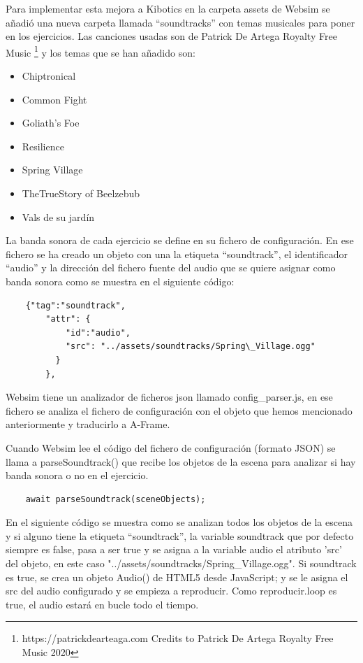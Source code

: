 Para implementar esta mejora a Kibotics en la carpeta assets de Websim se añadió una nueva carpeta llamada ``soundtracks'' con temas musicales para poner en los ejercicios. Las canciones usadas son de Patrick De Artega Royalty Free Music  \footnote{ https://patrickdearteaga.com Credits to Patrick De Artega Royalty Free Music 2020}
y los temas que se han añadido son:
\begin{itemize}
	\item Chiptronical 
	\item Common Fight 
	\item Goliath's Foe 
	\item Resilience 
	\item Spring Village 
	\item TheTrueStory of Beelzebub 
	\item Vals de su jardín
\end{itemize}

La banda sonora de cada ejercicio se define en su fichero de configuración. En ese fichero se ha creado un objeto con una  la etiqueta  ``soundtrack'', el identificador ``audio'' y la dirección del fichero fuente del audio que se quiere asignar como banda sonora como se muestra en el siguiente código:

\begin{lstlisting}
 	{"tag":"soundtrack",
        "attr": {
            "id":"audio",
            "src": "../assets/soundtracks/Spring\_Village.ogg"
          }
        },
   \end{lstlisting}

Websim tiene un analizador de ficheros json llamado config\_parser.js, en ese fichero se analiza el fichero de configuración con el objeto que hemos mencionado anteriormente y traducirlo a A-Frame.

Cuando Websim lee el código del fichero de configuración (formato JSON) se llama a parseSoundtrack() que recibe los objetos de la escena para analizar si hay banda sonora o no en el ejercicio.

\begin{lstlisting}
 	await parseSoundtrack(sceneObjects);
\end{lstlisting}

En el siguiente código se muestra como se analizan todos los objetos de la escena y si alguno tiene la etiqueta ``soundtrack'', la variable soundtrack  que por defecto siempre es false, pasa a ser true y se asigna a la variable audio el atributo  'src' del objeto, en este caso "../assets/soundtracks/Spring\_Village.ogg".  
Si soundtrack es true, se crea un objeto Audio() de HTML5 desde JavaScript; y se le asigna el src del audio configurado y se empieza a reproducir. Como reproducir.loop es true, el audio estará en bucle todo el tiempo.

